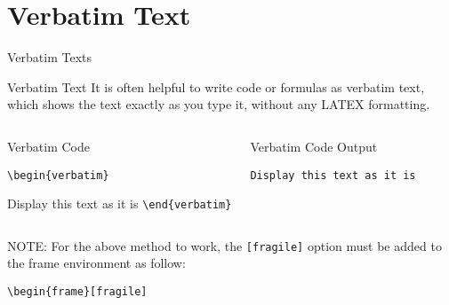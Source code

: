 \documentclass[10pt,xcolor=x11names]{beamer}
\begin{document}
\section{Verbatim Text}
\begin{frame}[fragile]{Verbatim Texts} 
\vspace{-5pt}

\begin{exampleblock}{Verbatim Text}
It is often helpful to write code or formulas as \alert {verbatim} text, which shows the text exactly as you type it, without any LATEX formatting.
\end{exampleblock}

\begin{columns}[t]	
\begin{block}{Verbatim Code}
	
\verb|\begin{verbatim}|

Display this text as it is
\verb|\end{verbatim}|

\end{block}

\begin{block}{Verbatim Code Output}
   \begin{verbatim}
Display this text as it is
   \end{verbatim}
\end{block}

\end{columns}

{\footnotesize  \begin{alertblock}{NOTE:}
 For the above method to work, the \verb|[fragile]| option must be added to the frame environment as follow:
 \begin{center}
 	\verb|\begin{frame}[fragile]|
 \end{center}
\end{alertblock}}

\end{frame}
\end{document}
